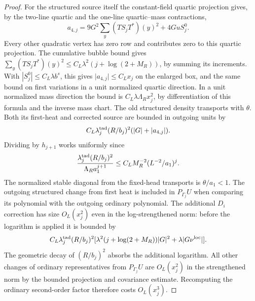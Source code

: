 \documentclass[11pt]{article}
\theoremstyle{definition}
\begin{document}
\begin{proof}
For the structured source itself the constant-field quartic
projection gives, by the two-line quartic and the one-line
quartic--mass contractions,
\begin{equation}
 a_{4,j}=9G^2\sum_y (TS_jT^*)(y)^2+4Gu S_j^0.
\end{equation}
Every other quadratic vertex has zero row and contributes zero to
this quartic projection. The cumulative bubble bound gives
\(\sum_y(TS_jT^*)(y)^2
 \le C_L\lambda^2(j+\log(2+M_R))\), by summing its increments.
With \(|S_j^0|\le C_L\lambda b^s\), this gives
\(\lvert a_{4,j}\rvert\le C_L x_j\) on the enlarged box, and
the same bound on first variations in a unit normalized quartic
direction. In a unit normalized mass direction the bound is
\(C_L\lambda\Lambda_R x_j^2\), by differentiation of this formula
and the inverse mass chart. The old structured density transports
with \(\theta\). Both its first-heat and corrected source are
bounded in outgoing units by
\begin{equation}
 C_L\lambda_j^{\rm tad}(R/b_j)^2
      (|G|+|a_{4,j}|).
\end{equation}
Dividing by \(h_{j+1}\) works uniformly since
\begin{equation}
 \frac{\lambda_j^{\rm tad}(R/b_j)^2}{\Lambda_R a_1^{j+1}}
 \le C_L M_R^{-2}(L^{-2}/a_1)^j .
\end{equation}
The normalized stable diagonal from the fixed-head transports is
\(\theta/a_1<1\). The outgoing structured change from first heat
is included in \(P_{\Gamma_j}U\) when comparing its polynomial
with the outgoing ordinary polynomial. The additional \(D_i\)
correction has size \(O_L(x_j^2)\) even in the log-strengthened
norm: before the logarithm is applied it is bounded by
\begin{equation}
 C_L\lambda_j^{\rm tad}(R/b_j)^2
   [\lambda^2(j+\log(2+M_R))|G|^2+\lambda |G\nu^{\rm loc}|] .
\end{equation}
The geometric decay of \((R/b_j)^2\) absorbs the additional
logarithm. All other changes of ordinary representatives from
\(P_{\Gamma_j}U\) are \(O_L(x_j^2)\) in the strengthened norm by
the bounded projection and covariance estimate. Recomputing the
ordinary second-order factor therefore costs \(O_L(x_j^3)\).


\end{proof}
\end{document}
